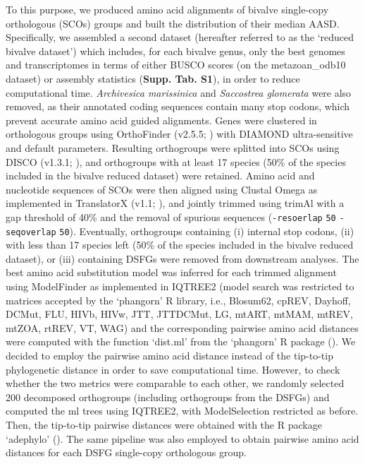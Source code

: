\documentclass[../main.tex]{subfiles}
\begin{document}
To this purpose, we produced amino acid alignments of bivalve single-copy orthologous (SCOs) groups and built the distribution of their median AASD. Specifically, we assembled a second dataset (hereafter referred to as the ‘reduced bivalve dataset’) which includes, for each bivalve genus, only the best genomes and transcriptomes in terms of either BUSCO scores (on the metazoan\_odb10 dataset) or assembly statistics (\textbf{Supp. Tab. S1}), in order to reduce computational time. \textit{Archivesica marissinica} and \textit{Saccostrea glomerata} were also removed, as their annotated coding sequences contain many stop codons, which prevent accurate amino acid guided alignments. Genes were clustered in orthologous groups using OrthoFinder (v2.5.5; \textbf{\cite{emms2019orthofinder}}) with DIAMOND ultra-sensitive and default parameters. Resulting orthogroups were splitted into SCOs using DISCO (v1.3.1; \textbf{\cite{willson2022disco}}), and orthogroups with at least 17 species (50\% of the species included in the bivalve reduced dataset) were retained. Amino acid and nucleotide sequences of SCOs were then aligned using Clustal Omega as implemented in TranslatorX (v1.1; \textbf{\cite{abascal2010translatorx}}), and jointly trimmed using trimAl with a gap threshold of 40\% and the removal of spurious sequences (\verb|-resoerlap| \verb|50| \verb|-seqoverlap| \verb|50|). Eventually, orthogroups containing (i) internal stop codons, (ii) with less than 17 species left (50\% of the species included in the bivalve reduced dataset), or (iii) containing DSFGs were removed from downstream analyses. The best amino acid substitution model was inferred for each trimmed alignment using ModelFinder as implemented in IQTREE2 (model search was restricted to matrices accepted by the ‘phangorn’ R library, i.e., Blosum62, cpREV, Dayhoff, DCMut, FLU, HIVb, HIVw, JTT, JTTDCMut, LG, mtART, mtMAM, mtREV, mtZOA, rtREV, VT, WAG) and the corresponding pairwise amino acid distances were computed with the function ‘dist.ml’ from the ‘phangorn’ R package (\textbf{\cite{schliep2011phangorn}}). We decided to employ the pairwise amino acid distance instead of the tip-to-tip phylogenetic distance in order to save computational time. However, to check whether the two metrics were comparable to each other, we randomly selected 200 decomposed orthogroups (including orthogroups from the DSFGs) and computed the \gls{ml} trees using IQTREE2, with ModelSelection restricted as before. Then, the tip-to-tip pairwise distances were obtained with the R package ‘adephylo’ (\textbf{\cite{jombart2010adephylo}}). The same pipeline was also employed to obtain pairwise amino acid distances for each DSFG single-copy orthologous group.
\end{document}
